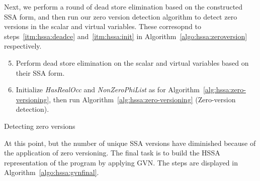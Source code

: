 Next, we perform a round of dead store elimination based on the constructed SSA
form, and then run our zero version detection algorithm to detect zero versions in the scalar and virtual variables.  These corresopnd to 
steps~\ref{itm:hssa:deadce} and~\ref{itm:hssa:init} in 
Algorithm~\ref{algo:hssa:zeroversion} respectively.

\begin{algorithm}[H]
\begin{enumerate}
\setcounter{enumi}{4}
\item\label{itm:hssa:deadce} Perform dead store elimination on the scalar and
virtual variables based on their SSA form.
\item\label{itm:hssa:init} Initialize \emph{HasRealOcc} and \emph{NonZeroPhiList} as for Algorithm~\ref{alg:hssa:zero-versioning}, then run Algorithm~\ref{alg:hssa:zero-versioning} (Zero-version detection).
\end{enumerate}
\caption{\label{algo:hssa:zeroversion}Detecting zero versions}
\end{algorithm}

At this point, but the number of unique SSA versions have diminished because of the application of zero versioning.  The final task is to build the HSSA
representation of the program by applying GVN.  The steps are displayed in
Algorithm~\ref{algo:hssa:gvnfinal}.

